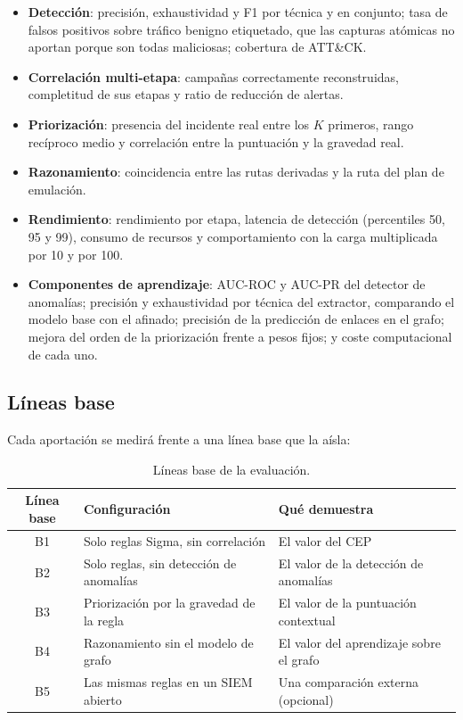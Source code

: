 \begin{itemize}
    \item \textbf{Detección}: precisión, exhaustividad y F1 por técnica y en conjunto; tasa de
    falsos positivos sobre tráfico benigno etiquetado, que las capturas atómicas no aportan
    porque son todas maliciosas; cobertura de ATT\&CK.
    \item \textbf{Correlación multi-etapa}: campañas correctamente reconstruidas, completitud
    de sus etapas y ratio de reducción de alertas.
    \item \textbf{Priorización}: presencia del incidente real entre los $K$ primeros,
    rango recíproco medio y correlación entre la puntuación y la gravedad real.
    \item \textbf{Razonamiento}: coincidencia entre las rutas derivadas y la ruta del plan de
    emulación.
    \item \textbf{Rendimiento}: rendimiento por etapa, latencia de detección (percentiles 50,
    95 y 99), consumo de recursos y comportamiento con la carga multiplicada por 10 y por 100.
    \item \textbf{Componentes de aprendizaje}: AUC-ROC y AUC-PR del detector de anomalías;
    precisión y exhaustividad por técnica del extractor, comparando el modelo base con el
    afinado; precisión de la predicción de enlaces en el grafo; mejora del orden de la
    priorización frente a pesos fijos; y coste computacional de cada uno.
\end{itemize}

\subsection{Líneas base}

Cada aportación se medirá frente a una línea base que la aísla:

\begin{table}[H]
\centering
\begin{tabular}{|c|p{6cm}|p{5cm}|}
\hline
\textbf{Línea base} & \textbf{Configuración} & \textbf{Qué demuestra} \\
\hline
B1 & Solo reglas Sigma, sin correlación & El valor del CEP \\
B2 & Solo reglas, sin detección de anomalías & El valor de la detección de anomalías \\
B3 & Priorización por la gravedad de la regla & El valor de la puntuación contextual \\
B4 & Razonamiento sin el modelo de grafo & El valor del aprendizaje sobre el grafo \\
B5 & Las mismas reglas en un SIEM abierto & Una comparación externa (opcional) \\
\hline
\end{tabular}
\caption{Líneas base de la evaluación.}
\label{tab:lineas-base}
\end{table}

